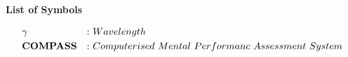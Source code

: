 \begin{center}
\textbf{\fontsize{17}{32}\selectfont List of Symbols}
\end{center}
\begin{align}
&{\bf \gamma} &:&~Wavelength \nonumber \\
&{\bf COMPASS} &:&~Computerised~Mental~Performanc~ Assessment~System\nonumber
\nonumber
\end{align}